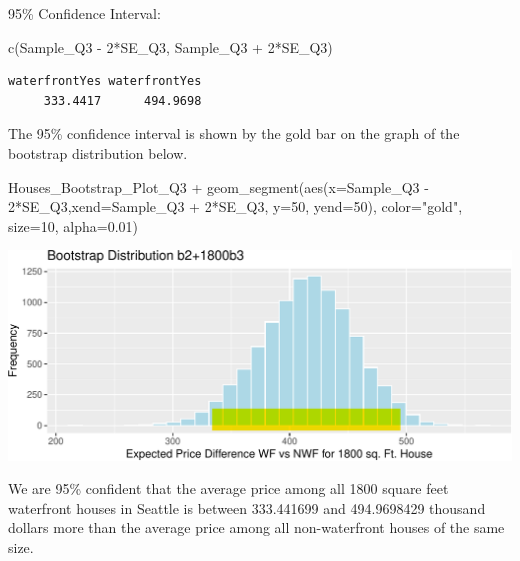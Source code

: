 \documentclass[
  letterpaper,
  DIV=11,
  numbers=noendperiod]{scrreprt}
\newenvironment{Shaded}{\begin{snugshade}}{\end{snugshade}}
\newcommand{\AttributeTok}[1]{\textcolor[rgb]{0.40,0.45,0.13}{#1}}
\newcommand{\DecValTok}[1]{\textcolor[rgb]{0.68,0.00,0.00}{#1}}
\newcommand{\FloatTok}[1]{\textcolor[rgb]{0.68,0.00,0.00}{#1}}
\newcommand{\FunctionTok}[1]{\textcolor[rgb]{0.28,0.35,0.67}{#1}}
\newcommand{\NormalTok}[1]{\textcolor[rgb]{0.00,0.23,0.31}{#1}}
\newcommand{\SpecialCharTok}[1]{\textcolor[rgb]{0.37,0.37,0.37}{#1}}
\newcommand{\StringTok}[1]{\textcolor[rgb]{0.13,0.47,0.30}{#1}}
\begin{document}
95\% Confidence Interval:

\begin{Shaded}
\begin{Highlighting}[]
\FunctionTok{c}\NormalTok{(Sample\_Q3 }\SpecialCharTok{{-}} \DecValTok{2}\SpecialCharTok{*}\NormalTok{SE\_Q3, Sample\_Q3 }\SpecialCharTok{+} \DecValTok{2}\SpecialCharTok{*}\NormalTok{SE\_Q3) }
\end{Highlighting}
\end{Shaded}

\begin{verbatim}
waterfrontYes waterfrontYes 
     333.4417      494.9698 
\end{verbatim}

The 95\% confidence interval is shown by the gold bar on the graph of
the bootstrap distribution below.

\begin{Shaded}
\begin{Highlighting}[]
\NormalTok{Houses\_Bootstrap\_Plot\_Q3 }\SpecialCharTok{+} 
  \FunctionTok{geom\_segment}\NormalTok{(}\FunctionTok{aes}\NormalTok{(}\AttributeTok{x=}\NormalTok{Sample\_Q3 }\SpecialCharTok{{-}} \DecValTok{2}\SpecialCharTok{*}\NormalTok{SE\_Q3,}\AttributeTok{xend=}\NormalTok{Sample\_Q3 }\SpecialCharTok{+} \DecValTok{2}\SpecialCharTok{*}\NormalTok{SE\_Q3, }\AttributeTok{y=}\DecValTok{50}\NormalTok{, }\AttributeTok{yend=}\DecValTok{50}\NormalTok{), }
               \AttributeTok{color=}\StringTok{"gold"}\NormalTok{, }\AttributeTok{size=}\DecValTok{10}\NormalTok{, }\AttributeTok{alpha=}\FloatTok{0.01}\NormalTok{) }
\end{Highlighting}
\end{Shaded}

\includegraphics{Ch3_files/figure-pdf/unnamed-chunk-171-1.pdf}

We are 95\% confident that the average price among all 1800 square feet
waterfront houses in Seattle is between 333.441699 and 494.9698429
thousand dollars more than the average price among all non-waterfront
houses of the same size.
\end{document}
